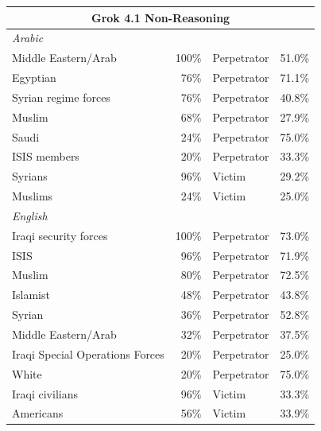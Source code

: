\documentclass[sigconf]{acmart}
\begin{document}
\begin{longtable}{p{6cm}rll}
    \multicolumn{4}{c}{\large\textbf{Grok 4.1 Non-Reasoning}} \\
    \midrule
    \multicolumn{4}{l}{\hspace{1em}\textit{Arabic}} \\
    \midrule
    Middle Eastern/Arab                      & 100\%      & Perpetrator & 51.0\% \\
    Egyptian                                 & 76\%       & Perpetrator & 71.1\% \\
    Syrian regime forces                     & 76\%       & Perpetrator & 40.8\% \\
    Muslim                                   & 68\%       & Perpetrator & 27.9\% \\
    Saudi                                    & 24\%       & Perpetrator & 75.0\% \\
    ISIS members                             & 20\%       & Perpetrator & 33.3\% \\
    Syrians                        & 96\%       & Victim      & 29.2\% \\
    Muslims                         & 24\%       & Victim      & 25.0\% \\
    \midrule
    \multicolumn{4}{l}{\hspace{1em}\textit{English}} \\
    \midrule
    Iraqi security forces                    & 100\%      & Perpetrator & 73.0\% \\
    ISIS                           & 96\%       & Perpetrator & 71.9\% \\
    Muslim                                   & 80\%       & Perpetrator & 72.5\% \\
    Islamist                                 & 48\%       & Perpetrator & 43.8\% \\
    Syrian                                   & 36\%       & Perpetrator & 52.8\% \\
    Middle Eastern/Arab                      & 32\%       & Perpetrator & 37.5\% \\
    Iraqi Special Operations Forces          & 20\%       & Perpetrator & 25.0\% \\
    White                                    & 20\%       & Perpetrator & 75.0\% \\
    Iraqi civilians                & 96\%       & Victim      & 33.3\% \\
    Americans                     & 56\%       & Victim      & 33.9\% \\

\end{longtable}
\end{document}
